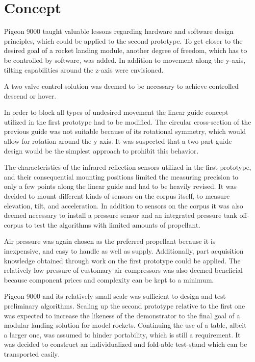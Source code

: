 \section{Concept}

Pigeon 9000 taught valuable lessons regarding hardware and software design principles, which could be applied to the second prototype. To get closer to the desired goal of a rocket landing module, another degree of freedom, which has to be controlled by software, was added. In addition to movement along the y-axis, tilting capabilities around the z-axis were envisioned. 

A two valve control solution was deemed to be necessary to achieve controlled descend or hover. 

In order to block all types of undesired movement the linear guide concept utilized in the first prototype had to be modified. The circular cross-section of the previous guide was not suitable because of its rotational symmetry, which would allow for rotation around the y-axis. It was suspected that a two part guide design would be the simplest approach to prohibit this behavior.

The characteristics of the infrared reflection sensors utilized in the first prototype, and their consequential mounting positions  limited the measuring precision to only a few points along the linear guide and had to be heavily revised. It was decided to mount different kinds of sensors on the corpus itself, to measure elevation, tilt, and acceleration. In addition to sensors on the corpus it was also deemed necessary to install a pressure sensor and an integrated pressure tank off-corpus to test the algorithms with limited amounts of propellant.

Air pressure was again chosen as the preferred propellant because it is inexpensive, and easy to handle as well as supply. Additionally, part acquisition knowledge obtained through work on the first prototype could be applied. The relatively low pressure of customary air compressors was also deemed beneficial because component prices and complexity can be kept to a minimum.

Pigeon 9000 and its relatively small scale was sufficient to design and test preliminary algorithms. Scaling up the second prototype relative to the first one was expected to increase the likeness of the demonstrator to the final goal of a modular landing solution for model rockets. Continuing the use of a table, albeit a larger one, was assumed to hinder portability, which is still a requirement. It was decided to construct an individualized and fold-able test-stand which can be transported easily.

